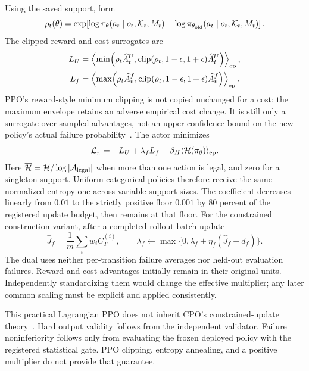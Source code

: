Using the saved support, form
\begin{equation}
 \rho_t(\theta)=\exp\!\left[
 \log\pi_\theta(a_t\mid o_t,\mathcal K_t,M_t)-
 \log\pi_{\theta_{\rm old}}(a_t\mid o_t,\mathcal K_t,M_t)\right].
\end{equation}
The clipped reward and cost surrogates are
\begin{align}
 L_U&=\left\langle\min\!\left(
 \rho_t\widehat A_t^U,
 \operatorname{clip}(\rho_t,1-\epsilon,1+\epsilon)\widehat A_t^U
 \right)\right\rangle_{\rm ep},\\
 L_f&=\left\langle\max\!\left(
 \rho_t\widehat A_t^f,
 \operatorname{clip}(\rho_t,1-\epsilon,1+\epsilon)\widehat A_t^f
 \right)\right\rangle_{\rm ep}.
 \label{eq:rl-ppo-surrogates}
\end{align}
PPO's reward-style minimum clipping is not copied unchanged for a cost: the maximum envelope
retains an adverse empirical cost change. It is still only a surrogate over sampled advantages,
not an upper confidence bound on the new policy's actual failure probability~\cite{ppo2017}.
The actor minimizes
\begin{equation}
 \mathcal L_\pi=-L_U+\lambda_fL_f-\beta_H
 \langle\overline{\mathcal H}(\pi_\theta)\rangle_{\rm ep}.
 \label{eq:rl-actor-loss}
\end{equation}
Here \(\overline{\mathcal H}=\mathcal H/\log|\mathcal A_{\rm legal}|\) when more than one
action is legal, and zero for a singleton support. Uniform categorical policies therefore receive
the same normalized entropy one across variable support sizes. The coefficient decreases linearly
from \(0.01\) to the strictly positive floor \(0.001\) by 80 percent of the registered update
budget, then remains at that floor.
For the constrained construction variant, after a completed rollout batch update
\begin{equation}
 \widehat J_f=\frac1m\sum_iw_iC_T^{(i)},\qquad
 \lambda_f\leftarrow\max\{0,\lambda_f+\eta_f(\widehat J_f-d_f)\}.
 \label{eq:rl-dual}
\end{equation}
The dual uses neither per-transition failure averages nor held-out evaluation failures. Reward and
cost advantages initially remain in their original units. Independently standardizing them would
change the effective multiplier; any later common scaling must be explicit and applied consistently.

This practical Lagrangian PPO does not inherit CPO's constrained-update theory~\cite{cpo2017}.
Hard output validity follows from the independent validator. Failure noninferiority follows only
from evaluating the frozen deployed policy with the registered statistical gate. PPO clipping,
entropy annealing, and a positive multiplier do not provide that guarantee.

